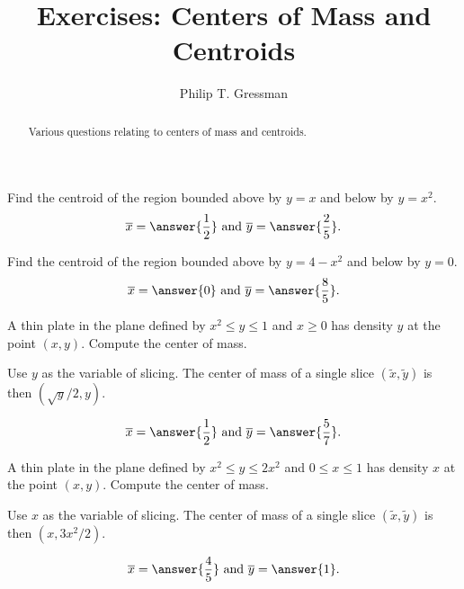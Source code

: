\documentclass{ximera}
\title{Exercises: Centers of Mass and Centroids}
\author{Philip T. Gressman}
\begin{document}
\begin{abstract}
Various questions relating to centers of mass and centroids.
\end{abstract}
\maketitle


\begin{exercise}%
Find the centroid of the region bounded above by $y = x$ and below by $y = x^2$.
\[ \overline{x} = \answer{\frac{1}{2}} \text{ and } \overline{y} = \answer{\frac{2}{5}}. \]
\end{exercise}

\begin{exercise}%
Find the centroid of the region bounded above by $y = 4-x^2$ and below by $y = 0$.
\[ \overline{x} = \answer{0} \text{ and } \overline{y} = \answer{\frac{8}{5}}. \]
\end{exercise}

\begin{exercise}
A thin plate in the plane defined by $x^2 \leq y \leq 1$ and $x \geq 0$ has density $y$ at the point $(x,y)$. Compute the center of mass.
\begin{hint}
Use $y$ as the variable of slicing. The center of mass of a single slice $(\tilde x, \tilde y)$ is then $(\sqrt{y}/2,y)$.
\end{hint}
\[ \overline{x} = \answer{\frac{1}{2}} \text{ and } \overline{y} = \answer{\frac{5}{7}}. \]
\end{exercise}

\begin{exercise}
A thin plate in the plane defined by $x^2 \leq y \leq 2x^2$ and $0 \leq x \leq 1$ has density $x$ at the point $(x,y)$. Compute the center of mass.
\begin{hint}
Use $x$ as the variable of slicing. The center of mass of a single slice $(\tilde x, \tilde y)$ is then $(x,3x^2/2)$.
\end{hint}
\[ \overline{x} = \answer{\frac{4}{5}} \text{ and } \overline{y} = \answer{1}. \]
\end{exercise}
\end{document}
